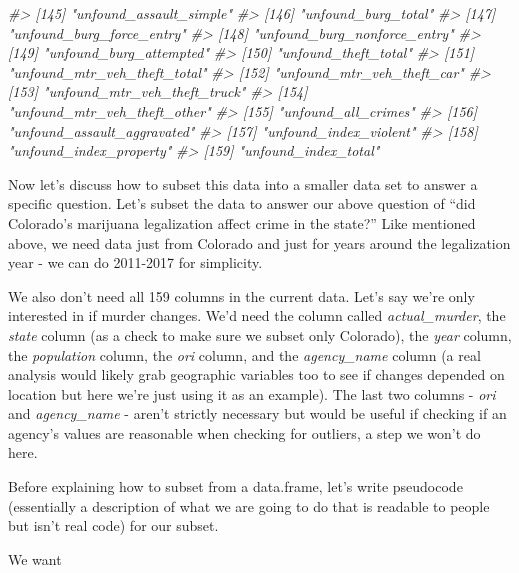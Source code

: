 \documentclass[
  12pt,
  openany]{book}
\newenvironment{Shaded}{\begin{snugshade}}{\end{snugshade}}
\newcommand{\CommentTok}[1]{\textcolor[rgb]{0.37,0.37,0.37}{\textit{#1}}}
\begin{document}
\begin{Shaded}
\begin{Highlighting}[]
\CommentTok{\#\textgreater{} [145] "unfound\_assault\_simple"        }
\CommentTok{\#\textgreater{} [146] "unfound\_burg\_total"            }
\CommentTok{\#\textgreater{} [147] "unfound\_burg\_force\_entry"      }
\CommentTok{\#\textgreater{} [148] "unfound\_burg\_nonforce\_entry"   }
\CommentTok{\#\textgreater{} [149] "unfound\_burg\_attempted"        }
\CommentTok{\#\textgreater{} [150] "unfound\_theft\_total"           }
\CommentTok{\#\textgreater{} [151] "unfound\_mtr\_veh\_theft\_total"   }
\CommentTok{\#\textgreater{} [152] "unfound\_mtr\_veh\_theft\_car"     }
\CommentTok{\#\textgreater{} [153] "unfound\_mtr\_veh\_theft\_truck"   }
\CommentTok{\#\textgreater{} [154] "unfound\_mtr\_veh\_theft\_other"   }
\CommentTok{\#\textgreater{} [155] "unfound\_all\_crimes"            }
\CommentTok{\#\textgreater{} [156] "unfound\_assault\_aggravated"    }
\CommentTok{\#\textgreater{} [157] "unfound\_index\_violent"         }
\CommentTok{\#\textgreater{} [158] "unfound\_index\_property"        }
\CommentTok{\#\textgreater{} [159] "unfound\_index\_total"}
\end{Highlighting}
\end{Shaded}

Now let's discuss how to subset this data into a smaller data set to answer a specific question. Let's subset the data to answer our above question of ``did Colorado's marijuana legalization affect crime in the state?'' Like mentioned above, we need data just from Colorado and just for years around the legalization year - we can do 2011-2017 for simplicity.

We also don't need all 159 columns in the current data. Let's say we're only interested in if murder changes. We'd need the column called \emph{actual\_murder}, the \emph{state} column (as a check to make sure we subset only Colorado), the \emph{year} column, the \emph{population} column, the \emph{ori} column, and the \emph{agency\_name} column (a real analysis would likely grab geographic variables too to see if changes depended on location but here we're just using it as an example). The last two columns - \emph{ori} and \emph{agency\_name} - aren't strictly necessary but would be useful if checking if an agency's values are reasonable when checking for outliers, a step we won't do here.

Before explaining how to subset from a data.frame, let's write pseudocode (essentially a description of what we are going to do that is readable to people but isn't real code) for our subset.

We want
\end{document}
